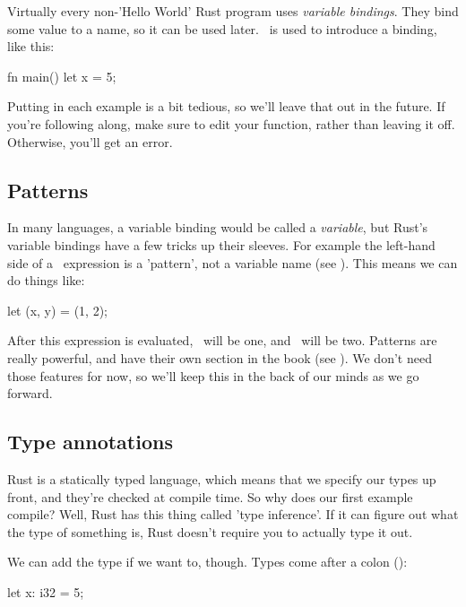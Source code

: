 Virtually every non-'Hello World' Rust program uses \emph{variable bindings}. They bind some value to a name, so it can be used 
later. \keylet\ is used to introduce a binding, like this:

\begin{rustc}
fn main() {
    let x = 5;
}
\end{rustc}

Putting  in each example is a bit tedious, so we'll leave that out in the future. If you're following along, 
make sure to edit your  function, rather than leaving it off. Otherwise, you'll get an error.

\subsection*{Patterns}

In many languages, a variable binding would be called a \emph{variable}, but Rust's variable bindings have a few tricks up 
their sleeves. For example the left-hand side of a \keylet\ expression is a 'pattern', not a variable name (see 
). This means we can do things like:

\begin{rustc}
let (x, y) = (1, 2);
\end{rustc}

After this expression is evaluated, \x\ will be one, and \y\ will be two. Patterns are really powerful, and have their 
own section in the book (see ). We don't need those features for now, so we'll keep this in the back 
of our minds as we go forward.

\subsection*{Type annotations}

Rust is a statically typed language, which means that we specify our types up front, and they're checked at compile time. So why 
does our first example compile? Well, Rust has this thing called 'type inference'. If it can figure out what the type of something
is, Rust doesn't require you to actually type it out.

\blank

We can add the type if we want to, though. Types come after a colon (\code{:}):

\begin{rustc}
let x: i32 = 5;
\end{rustc}

